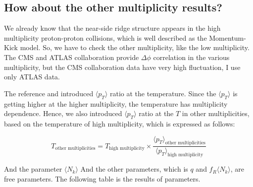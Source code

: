\documentclass[jkps,fleqn,showpacs,showkeys]{revtex4}
\begin{document}
\subsection*{How about the other multiplicity results?}
\label{subsec: How about the other multiplicity results?}

We already know that the near-side ridge structure appears in the high multiplicity proton-proton collisions, which is well described as the Momentum-Kick model.
So, we have to check the other multiplicity, like the low multiplicity.
The CMS and ATLAS collaboration provide $\Delta \phi$ correlation in the various multiplicity, but the CMS collaboration data have very high fluctuation, I use only ATLAS data.

The reference \cite{Wong_5} and \cite{PbPb} introduced $\langle p_T \rangle$ ratio at the temperature.
Since the $\langle p_T \rangle$ is getting higher at the higher multiplicity, the temperature has multiplicity dependence.
Hence, we also introduced $\langle p_T \rangle$ ratio at the $T$ in other multiplicities, based on the temperature of high multiplicity, which is expressed as follows:

\begin{equation} \label{equation:variousmulti}
  T_{\text{other multiplicities}} = T_{\text{high multiplicity}} \times \frac{\langle p_T \rangle_{\text{other multiplicities}}}{\langle p_T \rangle_{\text{high multiplicity}}}
\end{equation}

And the parameter $\langle N_k \rangle$ 
And the other parameters, which is $q$ and $f_R \langle N_k \rangle$, are free parameters.
The following table is the results of parameters.
\end{document}
